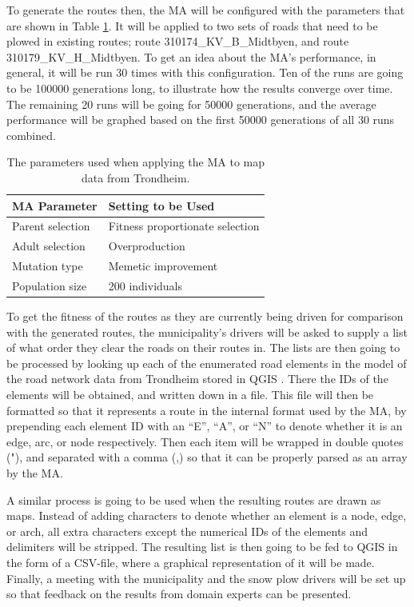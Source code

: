 To generate the routes then, the MA will be configured with the parameters that are shown in Table \ref{tab:trondheim_params_table}. It will be applied to two sets of roads that need to be plowed in existing routes; route 310174\_KV\_B\_Midtbyen, and route 310179\_KV\_H\_Midtbyen. To get an idea about the MA's performance, in general, it will be run 30 times with this configuration. Ten of the runs are going to be 100000 generations long, to illustrate how the results converge over time. The remaining 20 runs will be going for 50000 generations, and the average performance will be graphed based on the first 50000 generations of all 30 runs combined.

{
\begin{table}[tbph]
\centering
\begin{tabular}{ll}
\toprule
\textbf{MA Parameter} & \textbf{Setting to be Used}     \\ \midrule
Parent selection      & Fitness proportionate selection \\
Adult selection       & Overproduction                  \\
Mutation type         & Memetic improvement             \\
Population size       & 200 individuals                 \\ \bottomrule
\end{tabular}
\caption{The parameters used when applying the MA to map data from Trondheim.}
\label{tab:trondheim_params_table}
\end{table}
}

To get the fitness of the routes as they are currently being driven for comparison with the generated routes, the municipality's drivers will be asked to supply a list of what order they clear the roads on their routes in. The lists are then going to be processed by looking up each of the enumerated road elements in the model of the road network data from Trondheim stored in QGIS \citep{QGISHomepage}. There the IDs of the elements will be obtained, and written down in a file. This file will then be formatted so that it represents a route in the internal format used by the MA, by prepending each element ID with an \enquote{E}, \enquote{A}, or \enquote{N} to denote whether it is an edge, arc, or node respectively. Then each item will be wrapped in double quotes ("), and separated with a comma (,) so that it can be properly parsed as an array by the MA.

A similar process is going to be used when the resulting routes are drawn as maps. Instead of adding characters to denote whether an element is a node, edge, or arch, all extra characters except the numerical IDs of the elements and delimiters will be stripped. The resulting list is then going to be fed to QGIS in the form of a CSV-file, where a graphical representation of it will be made. Finally, a meeting with the municipality and the snow plow drivers will be set up so that feedback on the results from domain experts can be presented.

